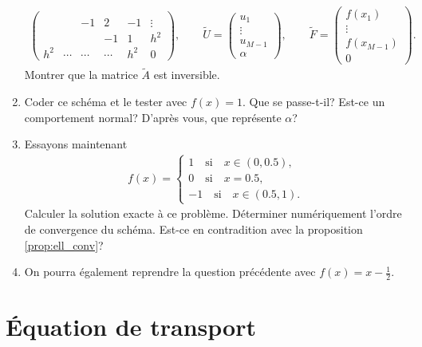 \documentclass[12pt,a4paper,twoside]{article}
\begin{document}
\begin{exercise}
\begin{enumerate}
\begin{align*}
\begin{pmatrix}
        \\
        & & -1 & 2 & -1 & \vdots
        \\
        & &    & -1 & 1 & h^2
        \\
        h^2 & \cdots & \cdots & \cdots &  h^2 & 0
      \end{pmatrix} ,
      \qquad \widetilde{U} = 
      \begin{pmatrix}
        u_1 \\ \vdots \\ u_{M-1} \\ \alpha
      \end{pmatrix} ,
      \qquad \widetilde{F} = 
      \begin{pmatrix}
        f(x_1) \\ \vdots \\ f(x_{M-1}) \\ 0
      \end{pmatrix} .
    \end{align*}
    Montrer que la matrice $\widetilde{A}$ est inversible.
  \item Coder ce sch\'ema et le tester avec $f(x)=1$.
    Que se passe-t-il? Est-ce un comportement normal?
    D'apr\`es vous, que repr\'esente $\alpha$?
  \item Essayons maintenant 
    \begin{align*}
      f(x) = \left\{
      \begin{array}{l}
        1 \quad \text{si} \quad x \in (0,0.5),
        \\
        0 \quad \text{si} \quad x=0.5,
        \\
        -1 \quad \text{si} \quad x \in (0.5,1).
      \end{array}
      \right.
    \end{align*}
    Calculer la solution exacte \`a ce probl\`eme. 
    D\'eterminer num\'eriquement l'ordre de convergence du sch\'ema. 
    Est-ce en contradition avec la proposition \ref{prop:ell_conv}?

  \item On pourra \'egalement reprendre la question pr\'ec\'edente avec
    $f(x) = x-\frac{1}{2}$.
  \end{enumerate}
\end{exercise}

\newpage
\section{\'Equation de transport}
\end{document}
